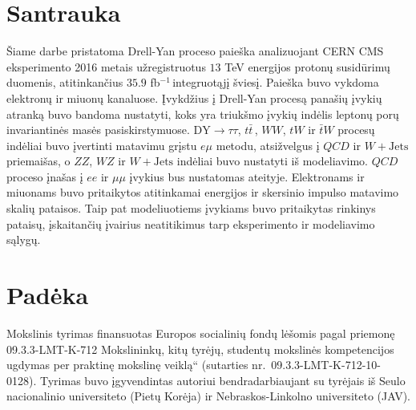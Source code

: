 \documentclass[a4paper, 12pt, twoside]{article}
\newcommand{\emu}{e\mu}
\newcommand{\DYtau}{\mathrm{DY} \! \rightarrow \! \tau\tau}
\newcommand{\ltq}[1]{{\quotedblbase{}#1\textquotedblleft{}}}
\newcommand{\invfb}{fb$^{-1}\,$}
\newlength\q
\begin{document}
\section*{Santrauka}
Šiame darbe pristatoma Drell-Yan proceso paieška analizuojant CERN CMS eksperimento 2016 metais užregistruotus
$13$ TeV energijos protonų susidūrimų duomenis, atitinkančius $35.9$ \invfb integruotąjį šviesį.
Paieška buvo vykdoma elektronų ir miuonų kanaluose.
Įvykdžius į Drell-Yan procesą panašių įvykių atranką buvo bandoma nustatyti, koks yra triukšmo įvykių indėlis
leptonų porų invariantinės masės pasiskirstymuose.
$\DYtau$, $t\bar{t}\,$, $WW$, $tW$ ir $\bar{t}W$ procesų indėliai buvo įvertinti matavimu grįstu $\emu$ metodu,
atsižvelgus į $QCD$ ir $W+\mathrm{Jets}$ priemaišas, o $ZZ$, $WZ$ ir $W+\mathrm{Jets}$ indėliai buvo nustatyti
iš modeliavimo.
$QCD$ proceso įnašas į $ee$ ir $\mu\mu$ įvykius bus nustatomas ateityje.
Elektronams ir miuonams buvo pritaikytos atitinkamai energijos ir skersinio impulso matavimo skalių pataisos.
Taip pat modeliuotiems įvykiams buvo pritaikytas rinkinys pataisų, įskaitančių įvairius neatitikimus tarp eksperimento
ir modeliavimo sąlygų.

\section*{Padėka}
Mokslinis tyrimas finansuotas Europos socialinių fondų lėšomis pagal priemonę 09.3.3-LMT-K-712
\ltq{Mokslininkų, kitų tyrėjų, studentų mokslinės kompetencijos ugdymas per praktinę mokslinę veiklą}
(sutarties nr.\ 09.3.3-LMT-K-712-10-0128).
Tyrimas buvo įgyvendintas autoriui bendradarbiaujant su tyrėjais iš Seulo nacionalinio universiteto (Pietų Korėja) ir
Nebraskos-Linkolno universiteto (JAV).




\end{document}
